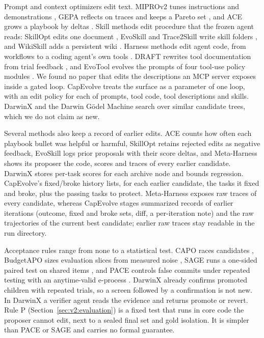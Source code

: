 Prompt and context optimizers edit text. MIPROv2 tunes instructions and demonstrations \citep{miprov2-dspy}, GEPA reflects on traces and keeps a Pareto set \citep{gepa}, and ACE grows a playbook by deltas \citep{ace}. Skill methods edit procedure that the frozen agent reads: SkillOpt edits one document \citep{skillopt}, EvoSkill and Trace2Skill write skill folders \citep{evoskill,trace2skill}, and WikiSkill adds a persistent wiki \citep{wikiskill}. Harness methods edit agent code, from workflows \citep{adas,aflow} to a coding agent's own tools \citep{dgm,meta-harness}. DRAFT rewrites tool documentation from trial feedback \citep{qu2025draft}, and EvoTool evolves the prompts of four tool-use policy modules \citep{evotool}. We found no paper that edits the descriptions an MCP server exposes inside a gated loop. CapEvolve treats the surface as a parameter of one loop, with an edit policy for each of prompts, tool code, tool descriptions and skills. DarwinX and the Darwin G\"odel Machine search over similar candidate trees, which we do not claim as new.

Several methods also keep a record of earlier edits. ACE counts how often each playbook bullet was helpful or harmful, SkillOpt retains rejected edits as negative feedback, EvoSkill logs prior proposals with their score deltas, and Meta-Harness shows its proposer the code, scores and traces of every earlier candidate. DarwinX stores per-task scores for each archive node and bounds regression. CapEvolve's fixed/broke history lists, for each earlier candidate, the tasks it fixed and broke, plus the passing tasks to protect. Meta-Harness exposes raw traces of every candidate, whereas CapEvolve stages summarized records of earlier iterations (outcome, fixed and broke sets, diff, a per-iteration note) and the raw trajectories of the current best candidate; earlier raw traces stay readable in the run directory.

Acceptance rules range from none to a statistical test. CAPO races candidates \citep{capo}, BudgetAPO sizes evaluation slices from measured noise \citep{liu2026budgetapo}, SAGE runs a one-sided paired test on shared items \citep{wang2026sage}, and PACE controls false commits under repeated testing with an anytime-valid e-process \citep{shawn2026pace}. DarwinX already confirms promoted children with repeated trials, so a screen followed by a confirmation is not new. In DarwinX a verifier agent reads the evidence and returns promote or revert. Rule P (Section~\ref{sec:v2:evaluation}) is a fixed test that runs in core code the proposer cannot edit, next to a sealed final set and gold isolation. It is simpler than PACE or SAGE and carries no formal guarantee.

